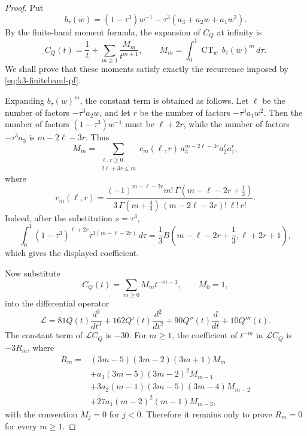 \documentclass[10pt,twoside,a4paper,reqno]{amsart}
\theoremstyle{plain}
\theoremstyle{definition}
\theoremstyle{remark}
\newcommand {\CT} {\operatorname {CT}}
\begin{document}
\begin{proof}
Put
\[
        b_\tau(w)=(1-\tau^3)w^{-1}
        -\tau^3(a_3+a_2w+a_1w^2).
\]
By the finite-band moment formula, the expansion of \(C_Q\) at infinity is
\[
        C_Q(t)=\frac1t+\sum_{m\ge1}\frac{M_m}{t^{m+1}},
        \qquad
        M_m=\int_0^1 \CT_w\, b_\tau(w)^m\,d\tau .
\]
We shall prove that these moments satisfy exactly the recurrence imposed by
\eqref{eq:k3-finiteband-pf}.

Expanding \(b_\tau(w)^m\), the constant term is obtained as follows.  Let
\(\ell\) be the number of factors \(-\tau^3a_2w\), and let \(r\) be the number
of factors \(-\tau^3a_1w^2\).  Then the number of factors
\((1-\tau^3)w^{-1}\) must be \(\ell+2r\), while the number of factors
\(-\tau^3a_3\) is \(m-2\ell-3r\).  Thus
\[
        M_m=\sum_{\substack{\ell,r\ge0\\2\ell+3r\le m}}
        c_m(\ell,r)\,
        a_3^{m-2\ell-3r}a_2^\ell a_1^r ,
\]
where
\[
        c_m(\ell,r)=
        \frac{(-1)^{m-\ell-2r}m!\,
        \Gamma(m-\ell-2r+\frac13)}
        {3\,\Gamma(m+\frac43)\,
        (m-2\ell-3r)!\,\ell!\,r!}.
\]
Indeed, after the substitution \(s=\tau^3\),
\[
        \int_0^1
        (1-\tau^3)^{\ell+2r}
        \tau^{3(m-\ell-2r)}\,d\tau
        =
        \frac13
        B\!\left(m-\ell-2r+\frac13,\ell+2r+1\right),
\]
which gives the displayed coefficient.

Now substitute
\[
        C_Q(t)=\sum_{m\ge0}M_m t^{-m-1},\qquad M_0=1,
\]
into the differential operator
\[
        \mathcal L
        =
        81Q(t)\frac{d^3}{dt^3}
        +162Q'(t)\frac{d^2}{dt^2}
        +90Q''(t)\frac{d}{dt}
        +10Q'''(t).
\]
The constant term of \(\mathcal L C_Q\) is \(-30\).  For \(m\ge1\), the
coefficient of \(t^{-m}\) in \(\mathcal L C_Q\) is \(-3R_m\), where
\[
\begin{split}
        R_m={}&
        (3m-5)(3m-2)(3m+1)M_m \\
        &+a_3(3m-5)(3m-2)^2M_{m-1} \\
        &+3a_2(m-1)(3m-5)(3m-4)M_{m-2} \\
        &+27a_1(m-2)^2(m-1)M_{m-3},
\end{split}
\]
with the convention \(M_j=0\) for \(j<0\).  Therefore it remains only to prove
\(R_m=0\) for every \(m\ge1\).


\end{proof}
\end{document}
